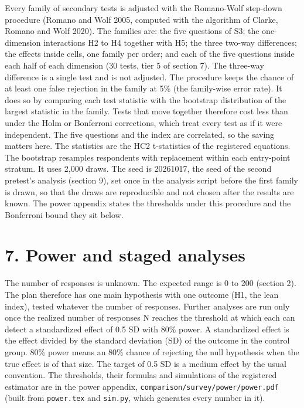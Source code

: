 Every family of secondary tests is adjusted with the Romano-Wolf step-down procedure (Romano and
Wolf 2005, computed with the algorithm of Clarke, Romano and Wolf 2020). The families are: the
five questions of S3; the one-dimension interactions H2 to H4 together with H5; the three two-way
differences; the effects inside cells, one family per order; and each of the five questions inside
each half of each dimension (30 tests, tier 5 of section 7). The three-way difference is a single
test and is not adjusted. The procedure keeps the chance of at least one false rejection in the
family at 5\% (the family-wise error rate). It does so by comparing each test statistic with the
bootstrap distribution of the largest statistic in the family. Tests that move together therefore
cost less than under the Holm or Bonferroni corrections, which treat every test as if it were
independent. The five questions and the index are correlated, so the saving matters here. The
statistics are the HC2 t-statistics of the registered equations. The bootstrap resamples
respondents with replacement within each entry-point stratum. It uses 2,000 draws. The seed is
20261017, the seed of the second pretest's analysis (section 9), set once in the analysis script
before the first family is drawn, so that the draws are reproducible and not chosen after the
results are known. The power appendix states the thresholds under this procedure and the
Bonferroni bound they sit below.

\section{7. Power and staged analyses}\label{power-and-staged-analyses}

The number of responses is unknown. The expected range is 0 to 200 (section 2). The plan therefore
has one main hypothesis with one outcome (H1, the lean index), tested whatever the number of
responses. Further analyses are run only once the realized number of responses N reaches the
threshold at which each can detect a standardized effect of 0.5 SD with 80\% power. A standardized
effect is the effect divided by the standard deviation (SD) of the outcome in the control group.
80\% power means an 80\% chance of rejecting the null hypothesis when the true effect is of that
size. The target of 0.5 SD is a medium effect by the usual convention. The thresholds, their formulas and
simulations of the registered estimator are in the power appendix,
\texttt{comparison/survey/power/power.pdf} (built from \texttt{power.tex} and \texttt{sim.py}, which generates every
number in it).

